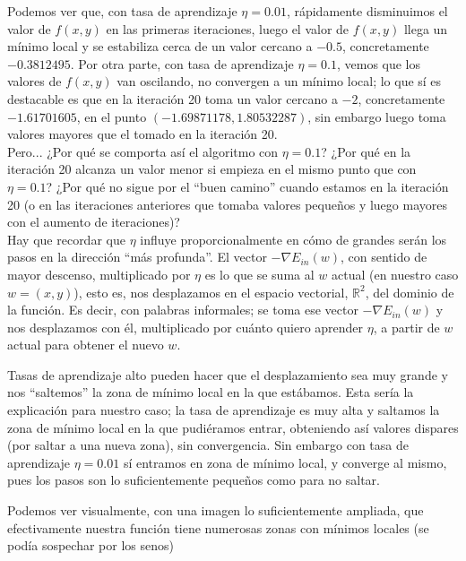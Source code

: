 \documentclass[11pt,a4paper]{article}
\theoremstyle{definition}
\newcommand{\R}{\mathbb{R}}
\begin{document}
\begin{itemize}
	 
	 Podemos ver que, con tasa de aprendizaje $\eta = 0.01$, rápidamente disminuimos el valor de $f(x,y)$ en las primeras iteraciones, luego el valor de $f(x,y)$ llega un mínimo local y se estabiliza cerca de un valor cercano a $-0.5$, concretamente $-0.3812495$. Por otra parte, con tasa de aprendizaje $\eta = 0.1$, vemos que los valores de $f(x,y)$ van oscilando, no convergen a un mínimo local; lo que sí es destacable es que en la iteración 20 toma un valor cercano a $-2$, concretamente $-1.61701605$, en el punto $(-1.69871178, 1.80532287)$, sin embargo luego toma valores mayores que el tomado en la iteración 20.\\
	 
	 Pero... ¿Por qué se comporta así el algoritmo con $\eta =0.1$? ¿Por qué en la iteración 20 alcanza un valor menor si empieza en el mismo punto que con $\eta = 0.1$? ¿Por qué no sigue por el ``buen camino'' cuando estamos en la iteración 20 (o en las iteraciones anteriores que tomaba valores pequeños y luego mayores con el aumento de iteraciones)?\\
	 
	 Hay que recordar que $\eta$ influye proporcionalmente en cómo de grandes serán los pasos en la dirección ``más profunda''. El vector $-\nabla E_{in}(w)$, con sentido de mayor descenso, multiplicado por $\eta$ es lo que se suma al $w$ actual (en nuestro caso $w=(x,y)$), esto es, nos desplazamos en el espacio vectorial, $\R^2$, del dominio de la función. Es decir, con palabras informales; se toma ese vector  $-\nabla E_{in}(w)$ y nos desplazamos con él, multiplicado por cuánto quiero aprender $\eta$, a partir de $w$ actual para obtener el nuevo $w$. 
	 
	 Tasas de aprendizaje alto pueden hacer que el desplazamiento sea muy grande y nos ``saltemos'' la zona de mínimo local en la que estábamos. Esta sería la explicación para nuestro caso; la tasa de aprendizaje es muy alta y saltamos la zona de mínimo local en la que pudiéramos entrar, obteniendo así valores dispares (por saltar a una nueva zona), sin convergencia. Sin embargo con tasa de aprendizaje $\eta = 0.01$ sí entramos en zona de mínimo local, y converge al mismo, pues los pasos son lo suficientemente pequeños como para no saltar. 
	 
	 Podemos ver visualmente, con una imagen lo suficientemente ampliada, que efectivamente nuestra función tiene numerosas zonas con mínimos locales (se podía sospechar por los senos)
	 

\end{itemize}
\end{document}
